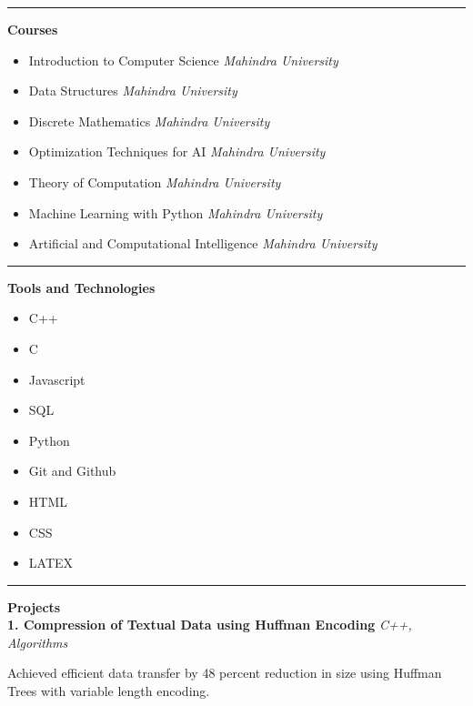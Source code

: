 \documentclass[a4paper, oneside, 12pt]{article}
\begin{document}
\begin{flushleft}
\vspace{5mm}
\hrule
\vspace{5mm}

{\Large\textbf{Courses}}
\begin{itemize}
\item[] Introduction to Computer Science \textit{\hfill Mahindra University}
\item[] Data Structures \textit{\hfill Mahindra University}
\item[] Discrete Mathematics \textit{\hfill Mahindra University}
\item[] Optimization Techniques for AI \textit{\hfill Mahindra University}
\item[] Theory of Computation \textit{\hfill Mahindra University}
\item[] Machine Learning with Python \textit{\hfill Mahindra University}
\item[] Artificial and Computational Intelligence \textit{\hfill Mahindra University}
\end{itemize}



\vspace{5mm}
\hrule
\vspace{5mm}

\pagebreak

{\Large\textbf{Tools and Technologies}} \\
\begin{multicols}{2}
\begin{itemize}
\item C++
\item C
\item Javascript
\item SQL
\item Python
\item Git and Github
\item HTML
\item CSS
\item LATEX
\end{itemize}
\end{multicols}

\vspace{5mm}
\hrule
\vspace{5mm}

{\Large\textbf{Projects}} \\
\vspace{5mm}
\textbf{1. Compression of Textual Data using Huffman Encoding} \textit{\hfill C++, Algorithms} \\
\vspace{2mm}
\begin{flushright}
Achieved efficient data transfer by 48 percent reduction in size using Huffman Trees with variable length encoding. \\
\end{flushright}


\end{flushleft}
\end{document}
